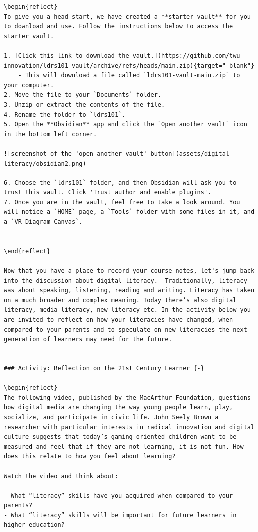 \documentclass[
]{book}
\theoremstyle{definition}
\theoremstyle{definition}
\theoremstyle{definition}
\theoremstyle{definition}
\theoremstyle{remark}
\begin{document}
\begin{verbatim}
\begin{reflect}
To give you a head start, we have created a **starter vault** for you to download and use. Follow the instructions below to access the starter vault.

1. [Click this link to download the vault.](https://github.com/twu-innovation/ldrs101-vault/archive/refs/heads/main.zip){target="_blank"}
    - This will download a file called `ldrs101-vault-main.zip` to your computer.
2. Move the file to your `Documents` folder.
3. Unzip or extract the contents of the file.
4. Rename the folder to `ldrs101`.
5. Open the **Obsidian** app and click the `Open another vault` icon in the bottom left corner.

![screenshot of the 'open another vault' button](assets/digital-literacy/obsidian2.png)

6. Choose the `ldrs101` folder, and then Obsidian will ask you to trust this vault. Click 'Trust author and enable plugins'.
7. Once you are in the vault, feel free to take a look around. You will notice a `HOME` page, a `Tools` folder with some files in it, and a `VR Diagram Canvas`.


\end{reflect}

Now that you have a place to record your course notes, let's jump back into the discussion about digital literacy.  Traditionally, literacy was about speaking, listening, reading and writing. Literacy has taken on a much broader and complex meaning. Today there’s also digital literacy, media literacy, new literacy etc. In the activity below you are invited to reflect on how your literacies have changed, when compared to your parents and to speculate on new literacies the next generation of learners may need for the future.


### Activity: Reflection on the 21st Century Learner {-}

\begin{reflect}
The following video, published by the MacArthur Foundation, questions how digital media are changing the way young people learn, play, socialize, and participate in civic life. John Seely Brown a researcher with particular interests in radical innovation and digital culture suggests that today’s gaming oriented children want to be measured and feel that if they are not learning, it is not fun. How does this relate to how you feel about learning?

Watch the video and think about:

- What “literacy” skills have you acquired when compared to your parents?  
- What “literacy” skills will be important for future learners in higher education?  


\end{verbatim}
\end{document}
